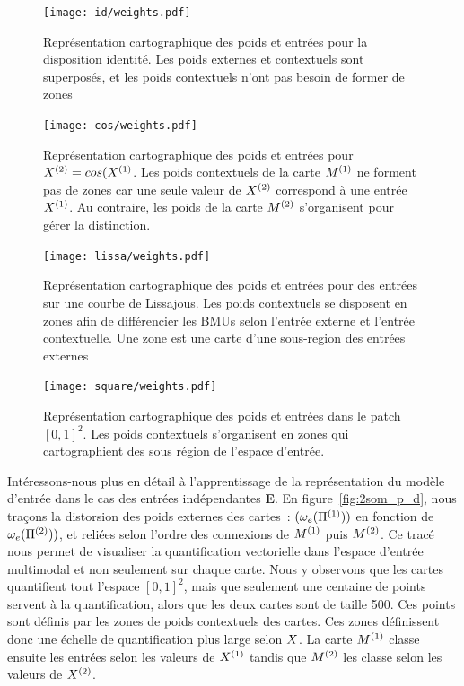 \documentclass[../main]{subfiles}
\begin{document}
\begin{figure}[H]
	\centering\texttt{[image: id/weights.pdf]}
	\vspace{-0.3cm}
	\caption{Représentation cartographique des poids et entrées pour la disposition identité. Les poids externes et contextuels sont superposés, et les poids contextuels n'ont pas besoin de former de zones \label{fig:id_results}}
\end{figure}
\begin{figure}[H]
	\centering\texttt{[image: cos/weights.pdf]}
	\vspace{-0.3cm}
	\caption{Représentation cartographique des poids et entrées pour $X^{({2})} = cos(X^{({1})}$. Les poids contextuels de la carte $M^{({1})}$ ne forment pas de zones car une seule valeur de $X^{({2})}$ correspond à une entrée $X^{({1})}$. Au contraire, les poids de la carte $M^{({2})}$ s'organisent pour gérer la distinction. \label{fig:cos_results}}
\end{figure}
\begin{figure}[H]
	\centering\texttt{[image: lissa/weights.pdf]}
	\vspace{-0.3cm}
	\caption{Représentation cartographique des poids et entrées pour des entrées sur une courbe de Lissajous. Les poids contextuels se disposent en zones afin de différencier les BMUs selon l'entrée externe et l'entrée contextuelle. Une zone est une carte d'une sous-region des entrées externes \label{fig:lissa}}
\end{figure}

\begin{figure}[ht]
	\centering\texttt{[image: square/weights.pdf]}
	\caption{Représentation cartographique des poids et entrées dans le patch $[0,1]^2$. Les poids contextuels s'organisent en zones qui cartographient des sous région de l'espace d'entrée. \label{fig:ind}}
\end{figure}

Intéressons-nous plus en détail à l'apprentissage de la représentation du modèle d'entrée dans le cas des entrées indépendantes \textbf{E}.
En figure~\ref{fig:2som_p_d}, nous traçons la distorsion des poids externes des cartes~: $(\omega_e(\Pi^{({1})}))$ en fonction de  $\omega_e(\Pi^{({2})}))$, et reliées selon l'ordre des connexions de $M^{({1})}$ puis $M^{({2})}$.
Ce tracé nous permet de visualiser la quantification vectorielle dans l'espace d'entrée multimodal et non seulement sur chaque carte. Nous y observons que les cartes quantifient tout l'espace $[0,1]^2$, mais que seulement une centaine de points servent à la quantification, alors que les deux cartes sont de taille 500. 
Ces points sont définis par les zones de poids contextuels des cartes. Ces zones définissent donc une échelle de quantification plus large selon $X$.
La carte $M^{({1})}$ classe ensuite les entrées selon les valeurs de $X^{({1})}$ tandis que $M^{({2})}$ les classe selon les valeurs de $X^{({2})}$. 
\end{document}

